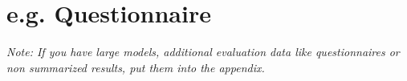 \chapter{e.g. Questionnaire}

\textit{Note: If you have large models, additional evaluation data like questionnaires or non summarized results, put them into the appendix.}
